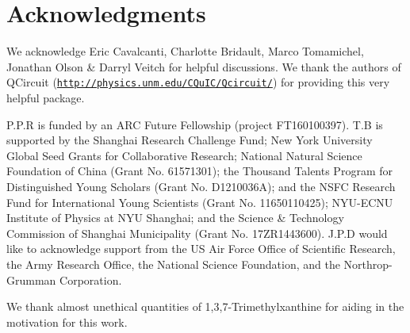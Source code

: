 %
%

\section*{Acknowledgments}

We acknowledge Eric Cavalcanti, Charlotte Bridault, Marco Tomamichel, Jonathan Olson \& Darryl Veitch for helpful discussions. We thank the authors of QCircuit (\texttt{\href{http://physics.unm.edu/CQuIC/Qcircuit/}{http://physics.unm.edu/CQuIC/Qcircuit/}}) for providing this very helpful package.

 P.P.R is funded by an ARC Future Fellowship (project FT160100397). T.B is supported by the Shanghai Research Challenge Fund; New York University Global Seed Grants for Collaborative Research; National Natural Science Foundation of China (Grant No. 61571301); the Thousand Talents Program for Distinguished Young Scholars (Grant No. D1210036A); and the NSFC Research Fund for International Young Scientists (Grant No. 11650110425); NYU-ECNU Institute of Physics at NYU Shanghai; and the Science \& Technology Commission of Shanghai Municipality (Grant No. 17ZR1443600). J.P.D would like to acknowledge support from the US Air Force Office of Scientific Research, the Army Research Office, the National Science Foundation, and the Northrop-Grumman Corporation.

We thank almost unethical quantities of 1,3,7-Trimethylxanthine for aiding in the motivation for this work.